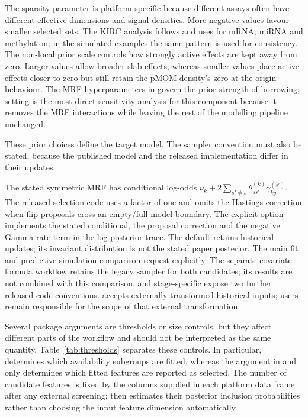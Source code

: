 \documentclass[article]{jss}
\begin{document}
The sparsity parameter  is platform-specific because different assays
often have different effective dimensions and signal densities.  More negative
values favour smaller selected sets.  The KIRC analysis follows
\citet{chekouo2017} and uses  for mRNA, miRNA and
methylation; in the simulated examples the same pattern is used for consistency.
The non-local prior scale  controls how strongly active effects are
kept away from zero.  Larger values allow broader slab effects, whereas smaller
values place active effects closer to zero but still retain the pMOM density's
zero-at-the-origin behaviour.  The MRF hyperparameters in
 govern the prior strength of borrowing; setting
 is the most direct sensitivity analysis for this component
because it removes the MRF interactions while leaving the rest of the modelling
pipeline unchanged.

These prior choices define the target model. The sampler convention must also
be stated, because the published model and the released implementation differ
in their updates.

The stated symmetric MRF has conditional log-odds
$\nu_k + 2\sum_{s'\ne s}\theta^{(k)}_{ss'}\gamma^{(s')}_{kg}$.
The released selection code uses a factor of one and omits the Hastings
correction when flip proposals cross an empty/full-model boundary.
The explicit  option implements the stated
conditional, the proposal correction and the negative Gamma rate term in the
log-posterior trace. The default  retains historical updates;
its invariant distribution is not the stated paper posterior. The main fit and predictive simulation comparison request 
explicitly. The separate covariate-formula workflow retains the legacy sampler
for both candidates; its results are not combined with this comparison.
 and stage-specific
 expose two further released-code conventions.
 accepts externally transformed historical inputs;
users remain responsible for the scope of that external transformation.

Several package arguments are thresholds or size controls, but they affect
different parts of the workflow and should not be interpreted as the same
quantity.  Table~\ref{tab:thresholds} separates these controls.  In particular,
 determines which availability subgroups are fitted, whereas the
 argument in  and  only determines
which fitted features are reported as selected.  The number of candidate
features is fixed by the columns supplied in each platform data frame after any
external screening;  then estimates their posterior
inclusion probabilities rather than choosing the input feature dimension
automatically.
\end{document}
